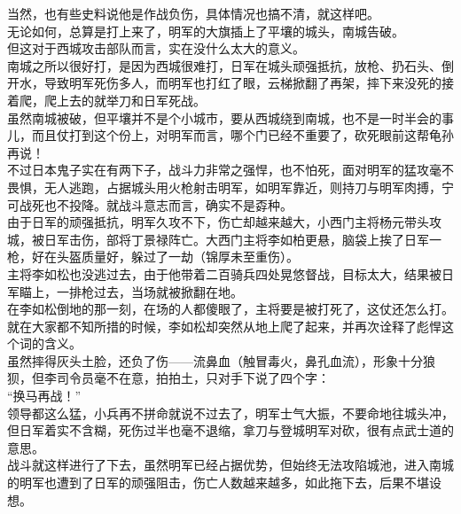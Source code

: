 \begin{multicols}{\theparacolNo}
当然，也有些史料说他是作战负伤，具体情况也搞不清，就这样吧。\\

无论如何，总算是打上来了，明军的大旗插上了平壤的城头，南城告破。\\

但这对于西城攻击部队而言，实在没什么太大的意义。\\

南城之所以很好打，是因为西城很难打，日军在城头顽强抵抗，放枪、扔石头、倒开水，导致明军死伤多人，而明军也打红了眼，云梯掀翻了再架，摔下来没死的接着爬，爬上去的就举刀和日军死战。\\

虽然南城被破，但平壤并不是个小城市，要从西城绕到南城，也不是一时半会的事儿，而且仗打到这个份上，对明军而言，哪个门已经不重要了，砍死眼前这帮龟孙再说！\\

不过日本鬼子实在有两下子，战斗力非常之强悍，也不怕死，面对明军的猛攻毫不畏惧，无人逃跑，占据城头用火枪射击明军，如明军靠近，则持刀与明军肉搏，宁可战死也不投降。就战斗意志而言，确实不是孬种。\\

由于日军的顽强抵抗，明军久攻不下，伤亡却越来越大，小西门主将杨元带头攻城，被日军击伤，部将丁景禄阵亡。大西门主将李如柏更悬，脑袋上挨了日军一枪，好在头盔质量好，躲过了一劫（锦厚未至重伤）。\\

主将李如松也没逃过去，由于他带着二百骑兵四处晃悠督战，目标太大，结果被日军瞄上，一排枪过去，当场就被掀翻在地。\\

在李如松倒地的那一刻，在场的人都傻眼了，主将要是被打死了，这仗还怎么打。\\

就在大家都不知所措的时候，李如松却突然从地上爬了起来，并再次诠释了彪悍这个词的含义。\\

虽然摔得灰头土脸，还负了伤——流鼻血（触冒毒火，鼻孔血流），形象十分狼狈，但李司令员毫不在意，拍拍土，只对手下说了四个字：\\

“换马再战！”\\

领导都这么猛，小兵再不拼命就说不过去了，明军士气大振，不要命地往城头冲，但日军着实不含糊，死伤过半也毫不退缩，拿刀与登城明军对砍，很有点武士道的意思。\\

战斗就这样进行了下去，虽然明军已经占据优势，但始终无法攻陷城池，进入南城的明军也遭到了日军的顽强阻击，伤亡人数越来越多，如此拖下去，后果不堪设想。\\


\end{multicols}
